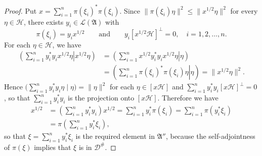 \documentclass[12pt,b5paper,twoside]{article}
\theoremstyle{takesaki}
\numberwithin{equation}{section}
\begin{document}
\begin{proof}
Put $x=\sum_{i=1}^{n}\pi(\xi_i)^*\pi(\xi_i)$.  Since
$\|\pi(\xi_i)\eta\|^2\leq\|x^{1/2}\eta\|^2$ for every
$\eta\in\mathcal H$, there exists $y_i\in\mathcal L(\mathfrak A)$
with
\[
  \pi(\xi_i)=y_ix^{1/2}
  \qquad\text{and}\qquad
  y_i[x^{1/2}\mathcal H]^\perp=0,
  \quad i=1,2,\ldots,n.
\]
For each $\eta\in\mathcal H$, we have
\begin{align*}
 \left(\left.\sum_{i=1}^{n}y_i^*y_ix^{1/2}\eta
       \right|x^{1/2}\eta\right)
 &=\left(\left.\sum_{i=1}^{n}x^{1/2}y_i^*y_ix^{1/2}\eta
       \right|\eta\right)\\
 &=\left(\left.\sum_{i=1}^{n}\pi(\xi_i)^*\pi(\xi_i)\eta
       \right|\eta\right)
  =\|x^{1/2}\eta\|^2.
\end{align*}
Hence
$\bigl(\sum_{i=1}^{n}y_i^*y_i\eta\mid\eta\bigr)=\|\eta\|^2$
for each $\eta\in[x\mathcal H]$ and
$\sum_{i=1}^{n}y_i^*y_i[x\mathcal H]^\perp=0$, so that
$\sum_{i=1}^{n}y_i^*y_i$ is the projection onto $[x\mathcal H]$.
Therefore we have
\begin{align*}
 x^{1/2}
 &=\left(\sum_{i=1}^{n}y_i^*y_i\right)x^{1/2}
  =\sum_{i=1}^{n}y_i^*\pi(\xi_i)
  =\sum_{i=1}^{n}\pi(y_i^*\xi_i)\\
 &=\pi\!\left(\sum_{i=1}^{n}y_i^*\xi_i\right),
\end{align*}
so that $\xi=\sum_{i=1}^{n}y_i^*\xi_i$ is the required element in
$\mathfrak A''$, because the self-adjointness of $\pi(\xi)$ implies
that $\xi$ is in $\mathcal D^{\#}$.
\end{proof}
\end{document}
